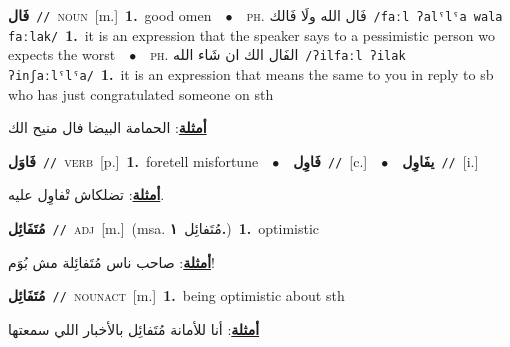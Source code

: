 \documentclass[10pt,a4paper,twoside]{article} %
\begin{document}
\begin{multicols}{2}
{\setlength\topsep{0pt}\textbf{\foreignlanguage{arabic}{فَال}}\ {\color{gray}\texttt{//}\color{black}}\ \textsc{noun}\ [m.]\ \textbf{1.}~good omen\ \ $\bullet$\ \ \textsc{ph.} \color{gray} \foreignlanguage{arabic}{فَال الله ولَا فَالك}\color{black}\ {\color{gray}\texttt{/{\sffamily faːl ʔalˤlˤa wala faːlak}/}\color{black}}\ \textbf{1.}~it is an expression that the speaker says to a pessimistic person wo expects the worst\ \ $\bullet$\ \ \textsc{ph.} \color{gray} \foreignlanguage{arabic}{الفَال الك ان شَاء الله}\color{black}\ {\color{gray}\texttt{/{\sffamily ʔilfaːl ʔilak ʔinʃaːlˤlˤa}/}\color{black}}\ \textbf{1.}~it is an expression that means the same to you in reply to sb who has just congratulated someone on sth\  \begin{flushright}\color{gray}\foreignlanguage{arabic}{\textbf{\underline{\foreignlanguage{arabic}{أمثلة}}}: الحمامة البيضا فال منيح الك}\end{flushright}\color{black}} \vspace{2mm}

{\setlength\topsep{0pt}\textbf{\foreignlanguage{arabic}{فَاوَل}}\ {\color{gray}\texttt{//}\color{black}}\ \textsc{verb}\ [p.]\ \textbf{1.}~foretell misfortune\ \ $\bullet$\ \ \setlength\topsep{0pt}\textbf{\foreignlanguage{arabic}{فَاوِل}}\ {\color{gray}\texttt{//}\color{black}}\ [c.]\ \ $\bullet$\ \ \setlength\topsep{0pt}\textbf{\foreignlanguage{arabic}{يفَاوِل}}\ {\color{gray}\texttt{//}\color{black}}\ [i.]\  \begin{flushright}\color{gray}\foreignlanguage{arabic}{\textbf{\underline{\foreignlanguage{arabic}{أمثلة}}}: تضلكاش تْفاوِل عليه.}\end{flushright}\color{black}} \vspace{2mm}

{\setlength\topsep{0pt}\textbf{\foreignlanguage{arabic}{مُتَفَائِل}}\ {\color{gray}\texttt{//}\color{black}}\ \textsc{adj}\ [m.]\ \color{gray}(msa. \foreignlanguage{arabic}{مُتَفائِل}~\foreignlanguage{arabic}{\textbf{١.}})\color{black}\ \textbf{1.}~optimistic\  \begin{flushright}\color{gray}\foreignlanguage{arabic}{\textbf{\underline{\foreignlanguage{arabic}{أمثلة}}}: صاحب ناس مُتَفائِلة مش بُوَم!}\end{flushright}\color{black}} \vspace{2mm}

{\setlength\topsep{0pt}\textbf{\foreignlanguage{arabic}{مُتَفَائِل}}\ {\color{gray}\texttt{//}\color{black}}\ \textsc{noun\textunderscore act}\ [m.]\ \textbf{1.}~being optimistic about sth\  \begin{flushright}\color{gray}\foreignlanguage{arabic}{\textbf{\underline{\foreignlanguage{arabic}{أمثلة}}}: أنا للأمانة مُتَفائِل بالأخبار اللي سمعتها}\end{flushright}\color{black}} \vspace{2mm}


\end{multicols}
\end{document}
